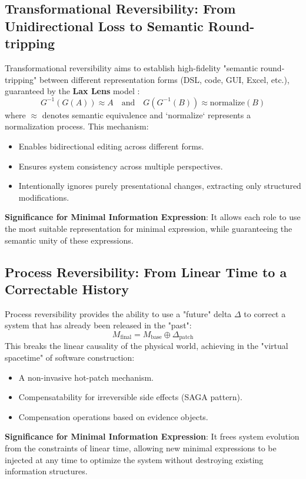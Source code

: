 \documentclass[11pt]{article}
\begin{document}
\subsection{Transformational Reversibility: From Unidirectional Loss to Semantic Round-tripping}

Transformational reversibility aims to establish high-fidelity "semantic round-tripping" between different representation forms (DSL, code, GUI, Excel, etc.), guaranteed by the \textbf{Lax Lens} model \cite{foster2007}:
\[
G^{-1}(G(A)) \approx A \quad \text{and} \quad G(G^{-1}(B)) \approx \text{normalize}(B)
\]
where $\approx$ denotes semantic equivalence and `normalize` represents a normalization process. This mechanism:
\begin{itemize}
    \item Enables bidirectional editing across different forms.
    \item Ensures system consistency across multiple perspectives.
    \item Intentionally ignores purely presentational changes, extracting only structured modifications.
\end{itemize}
\textbf{Significance for Minimal Information Expression}: It allows each role to use the most suitable representation for minimal expression, while guaranteeing the semantic unity of these expressions.

\subsection{Process Reversibility: From Linear Time to a Correctable History}

Process reversibility provides the ability to use a "future" delta $\Delta$ to correct a system that has already been released in the "past":
\[
M_{\text{final}} = M_{\text{base}} \oplus \Delta_{\text{patch}}
\]
This breaks the linear causality of the physical world, achieving in the "virtual spacetime" of software construction:
\begin{itemize}
    \item A non-invasive hot-patch mechanism.
    \item Compensatability for irreversible side effects (SAGA pattern).
    \item Compensation operations based on evidence objects.
\end{itemize}
\textbf{Significance for Minimal Information Expression}: It frees system evolution from the constraints of linear time, allowing new minimal expressions to be injected at any time to optimize the system without destroying existing information structures.
\end{document}

